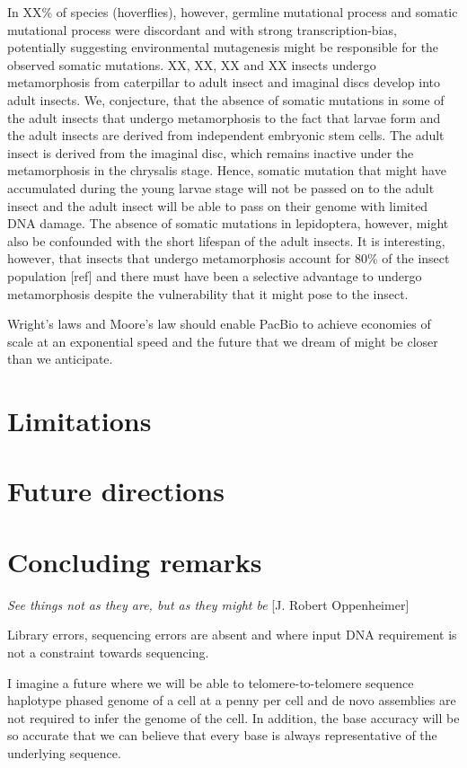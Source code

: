 In XX\% of species (hoverflies), however, germline mutational process and somatic mutational process were discordant and with strong transcription-bias, potentially suggesting environmental mutagenesis might be responsible for the observed somatic mutations. XX, XX, XX and XX insects undergo metamorphosis from caterpillar to adult insect and imaginal discs develop into adult insects. We, conjecture, that the absence of somatic mutations in some of the adult insects that undergo metamorphosis to the fact that larvae form and the adult insects are derived from independent embryonic stem cells. The adult insect is derived from the imaginal disc, which remains inactive under the metamorphosis in the chrysalis stage. Hence, somatic mutation that might have accumulated during the young larvae stage will not be passed on to the adult insect and the adult insect will be able to pass on their genome with limited DNA damage. The absence of somatic mutations in lepidoptera, however, might also be confounded with the short lifespan of the adult insects. It is interesting, however, that insects that undergo metamorphosis account for 80\% of the insect population [ref] and there must have been a selective advantage to undergo metamorphosis despite the vulnerability that it might pose to the insect.

Wright’s laws and Moore’s law should enable PacBio to achieve economies of scale at an exponential speed and the future that we dream of might be closer than we anticipate. 

\section{Limitations}

\section{Future directions}

\section{Concluding remarks}


\textit{See things not as they are, but as they might be} [J. Robert Oppenheimer]

Library errors, sequencing errors are absent and where input DNA requirement is not a constraint towards sequencing. 

I imagine a future where we will be able to telomere-to-telomere sequence haplotype phased genome of a cell at a penny per cell and de novo assemblies are not required to infer the genome of the cell. In addition, the base accuracy will be so accurate that we can believe that every base is always representative of the underlying sequence. 

